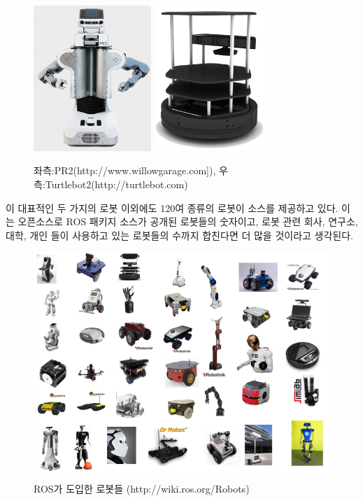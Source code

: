 \begin{figure}[h]
\centering\includegraphics[height=55mm]{pictures/chapter8/PR2.png}
\centering\includegraphics[height=55mm]{pictures/chapter8/turtlebot2.png}
\caption{좌측:PR2(http://www.willowgarage.com]), 우측:Turtlebot2(http://turtlebot.com)}
\end{figure}

\vspace{\baselineskip}
\noindent
이 대표적인 두 가지의 로봇 이외에도 120여 종류의 로봇이 소스를 제공하고 있다.  이는 오픈소스로 ROS 패키지 소스가 공개된 로봇들의 숫자이고, 로봇 관련 회사, 연구소, 대학, 개인 들이 사용하고 있는 로봇들의 수까지 합친다면 더 많을 것이라고 생각된다.

\begin{figure}[h]
\centering\includegraphics[width=\columnwidth]{pictures/chapter8/robots.png}
\caption{ROS가 도입한 로봇들 (http://wiki.ros.org/Robots)}
\end{figure}

